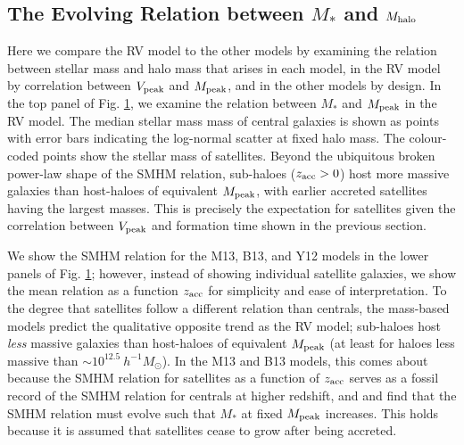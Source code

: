 \documentclass[a4paper,fleqn,usenatbib]{mnras}
\begin{document}
\begin{figure}
    \label{fig:SMHM_comparison}
\end{figure}


\subsection{The Evolving Relation between $M_*$ and $M_{\rm halo}$}
\label{sec:rv_sm_evolv}

Here we compare the RV model to the other models by examining the relation between stellar mass and halo mass that arises in each model, in the RV model by correlation between $V_{\rm peak}$ and $M_{\rm peak}$, and in the other models by design.  In the top panel of Fig. \ref{fig:SMHM_comparison}, we examine the relation between $M_*$ and $M_{\rm peak}$ in the RV model.  The median stellar mass mass of central galaxies is shown as points with error bars indicating the log-normal scatter at fixed halo mass.  The colour-coded points show the stellar mass of satellites.  Beyond the ubiquitous broken power-law shape of the SMHM relation, sub-haloes ($z_{\rm acc}>0$) host more massive galaxies than host-haloes of equivalent $M_{\rm peak}$, with earlier accreted satellites having the largest masses.  This is precisely the expectation for satellites given the correlation between $V_{\rm peak}$ and formation time shown in the previous section.

We show the SMHM relation for the M13, B13, and Y12 models in the lower panels of Fig. \ref{fig:SMHM_comparison}; however, instead of showing individual satellite galaxies, we show the mean relation as a function $z_{\rm acc}$ for simplicity and ease of interpretation.  To the degree that satellites follow a different relation than centrals, the mass-based models predict the qualitative opposite trend as the RV model; sub-haloes host {\em less} massive galaxies than host-haloes of equivalent $M_{\rm peak}$ (at least for haloes less massive than $\sim 10^{12.5} ~ h^{-1} M_{\odot}$).  In the M13 and B13 models, this comes about because the SMHM relation for satellites as a function of $z_{\rm acc}$ serves as a fossil record of the SMHM relation for centrals at higher redshift, and \citet{Moster:2013ab} and \citet{Behroozi:2013fg} find that the SMHM relation must evolve such that $M_*$ at fixed $M_{\rm peak}$ increases.  This holds because it is assumed that satellites cease to grow after being accreted. 
\end{document}
